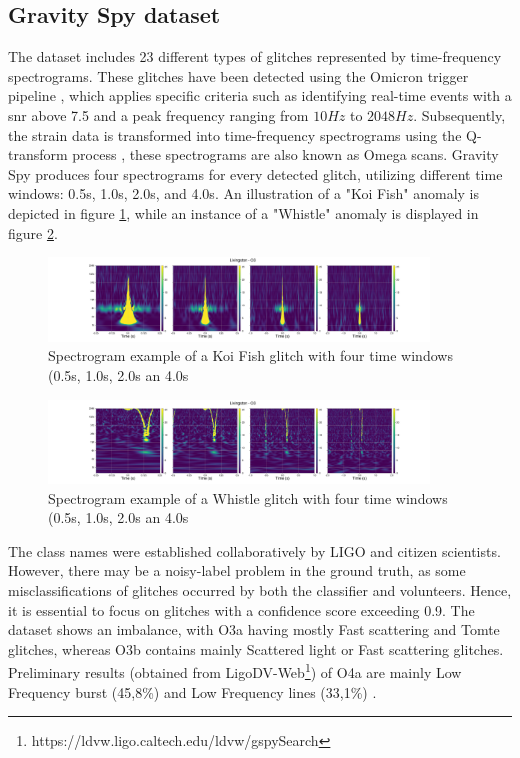 \subsection{Gravity Spy dataset}
The dataset includes 23 different types of glitches represented by time-frequency spectrograms. These glitches have been detected using the Omicron trigger pipeline \citep{robinet2020omicron}, which applies specific criteria such as identifying real-time events with a \acrshort{snr} above 7.5 and a peak frequency ranging from $10 Hz$ to $2048 Hz$. Subsequently, the strain data is transformed into time-frequency spectrograms using the Q-transform process \citep{chatterji2004multiresolution}, these spectrograms are also known as Omega scans.
Gravity Spy produces four spectrograms for every detected glitch, utilizing different time windows: 0.5s, 1.0s, 2.0s, and 4.0s. An illustration of a "Koi Fish" anomaly is depicted in figure \ref{fig:koifish}, while an instance of a "Whistle" anomaly is displayed in figure \ref{fig:whistle}.
\begin{figure}[H]
    \centering
    \includegraphics[width=0.9\textwidth]{Images/koi_fish_1250427024.302.png}
    \caption{Spectrogram example of a Koi Fish glitch with four time windows (0.5s, 1.0s, 2.0s an 4.0s}
    \label{fig:koifish}
\end{figure}
\begin{figure}[H]
    \centering
    \includegraphics[width=0.9\textwidth]{Images/whistle_1239025005.518.png}
    \caption{Spectrogram example of a Whistle glitch with four time windows (0.5s, 1.0s, 2.0s an 4.0s}
    \label{fig:whistle}
\end{figure}
The class names were established collaboratively by LIGO and citizen scientists. However, there may be a noisy-label problem in the ground truth, as some misclassifications of glitches occurred by both the classifier and volunteers. Hence, it is essential to focus on glitches with a confidence score exceeding 0.9. The dataset shows an imbalance, with O3a having mostly Fast scattering and Tomte glitches, whereas O3b contains mainly Scattered light or Fast scattering glitches. Preliminary results (obtained from LigoDV-Web\footnote{https://ldvw.ligo.caltech.edu/ldvw/gspySearch}) of O4a are mainly Low Frequency burst (45,8\%) and Low Frequency lines (33,1\%) . 

